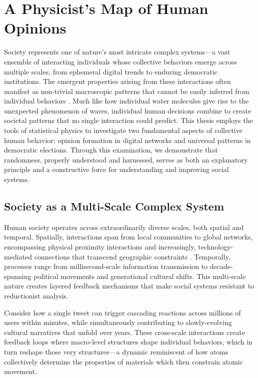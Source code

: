 \chapter{A Physicist's Map of Human Opinions}
\label{chap1}
Society represents one of nature's most intricate complex systems—a vast ensemble of interacting individuals whose collective behaviors emerge across multiple scales, from ephemeral digital trends to enduring democratic institutions. The emergent properties arising from these interactions often manifest as non-trivial macroscopic patterns that cannot be easily inferred from individual behaviors \cite{galam2012sociophysics}. Much like how individual water molecules give rise to the unexpected phenomenon of waves, individual human decisions combine to create societal patterns that no single interaction could predict. This thesis employs the tools of statistical physics to investigate two fundamental aspects of collective human behavior: opinion formation in digital networks and universal patterns in democratic elections. Through this examination, we demonstrate that randomness, properly understood and harnessed, serves as both an explanatory principle and a constructive force for understanding and improving social systems.

\section{Society as a Multi-Scale Complex System}
Human society operates across extraordinarily diverse scales, both spatial and temporal. Spatially, interactions span from local communities to global networks, encompassing physical proximity interactions and increasingly, technology-mediated connections that transcend geographic constraints \cite{social-media-as-public-opinion}. Temporally, processes range from millisecond-scale information transmission to decade-spanning political movements and generational cultural shifts. This multi-scale nature creates layered feedback mechanisms that make social systems resistant to reductionist analysis.

Consider how a single tweet can trigger cascading reactions across millions of users within minutes, while simultaneously contributing to slowly-evolving cultural narratives that unfold over years. These cross-scale interactions create feedback loops where macro-level structures shape individual behaviors, which in turn reshape those very structures—a dynamic reminiscent of how atoms collectively determine the properties of materials which then constrain atomic movement.

